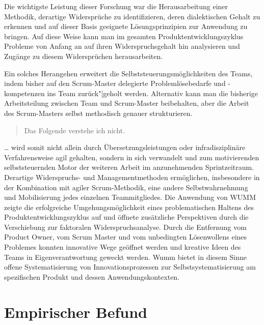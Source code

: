 \documentclass[a4paper,11pt]{article}
\begin{document}
Die wichtigste Leistung dieser Forschung war die Herausarbeitung einer
Methodik, derartige Widersprüche zu identifizieren, deren dialektischen Gehalt
zu erkennen und auf dieser Basis geeignete Lösungsprinzipien zur Anwendung zu
bringen. Auf diese Weise kann man im gesamten Produktentwicklungszyklus
Probleme von Anfang an auf ihren Widerspruchsgehalt hin  analysieren und
Zugänge zu diesem Widersprüchen herausarbeiten.

Ein solches Herangehen erweitert die Selbststeuerungsmöglichkeiten des Teams,
indem bisher auf den Scrum-Master delegierte Problemlösebedarfe und
-kompetenzen ins Team zurück"|geholt werden. Alternativ kann man die bisherige
Arbeitsteilung zwischen Team und Scrum-Master beibehalten, aber die Arbeit des
Scrum-Masters selbst methodisch genauer strukturieren.

\begin{quote}
  Das Folgende verstehe ich nicht.
\end{quote}
… wird somit nicht allein durch Übersetzungsleistungen oder infradisziplinäre
Verfahrensweise agil gehalten, sondern in sich verwandelt und zum
motivierenden selbststeuernden Motor der weiteren Arbeit im anzunehmenden
Sprintzeitraum. Derartige Widerspruchs- und Managementmethoden ermöglichen,
insbesondere in der Kombination mit agiler Scrum-Methodik, eine andere
Selbstwahrnehmung und Mobilisierung jedes einzelnen Teammitgliedes. Die
Anwendung von WUMM zeigte die erfolgreiche Umgehungsmöglichkeit eines
problematischen Haltens des Produktentwicklungszyklus auf und öffnete
zusätzliche Perspektiven durch die Verschiebung zur faktoralen
Widerspruchsanalyse. Durch die Entfernung vom Product Owner, vom Scrum Master
und vom unbedingten Lösenwollens eines Problemes konnten innovative Wege
geöffnet werden und kreative Ideen des Teams in Eigenverantwortung geweckt
werden. Wumm bietet in diesem Sinne offene Systematisierung von
Innovationsprozessen zur Selbstsystematisierung am spezifischen Produkt und
dessen Anwendungskontexten.

\section*{Empirischer Befund}
\end{document}
